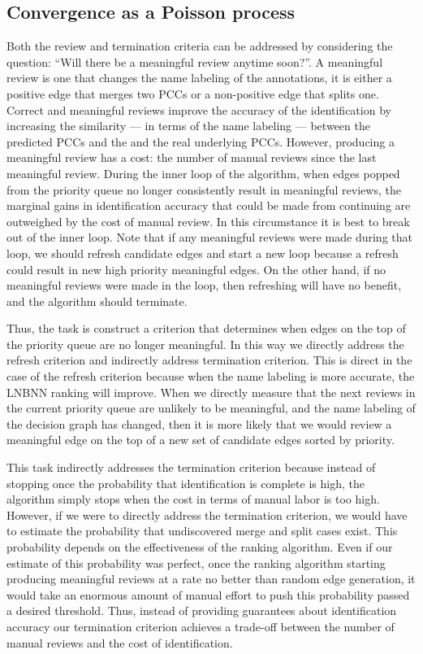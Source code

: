 \subsection{Convergence as a Poisson process}

Both the review and termination criteria can be addressed by considering the question:
``Will there be a meaningful review anytime soon?''.
A meaningful review is one that changes the name labeling of the annotations, \ie{} it is either a positive edge
  that merges two PCCs or a non-positive edge that splits one.
Correct and meaningful reviews improve the accuracy of the identification by increasing the similarity --- in
  terms of the name labeling --- between the predicted PCCs and the and the real underlying PCCs.
However, producing a meaningful review has a cost:
the number of manual reviews since the last meaningful review.
During the inner loop of the algorithm, when edges popped from the priority queue no longer consistently result
  in meaningful reviews, the marginal gains in identification accuracy that could be made from continuing are
  outweighed by the cost of manual review.
In this circumstance it is best to break out of the inner loop.
Note that if any meaningful reviews were made during that loop, we should refresh candidate edges and start a new
  loop because a refresh could result in new high priority meaningful edges.
On the other hand, if no meaningful reviews were made in the loop, then refreshing will have no benefit, and the
  algorithm should terminate.

Thus, the task is construct a criterion that determines when edges on the top of the priority queue are no longer
  meaningful.
In this way we directly address the refresh criterion and indirectly address termination criterion.
This is direct in the case of the refresh criterion because when the name labeling is more accurate, the LNBNN
  ranking will improve.
When we directly measure that the next reviews in the current priority queue are unlikely to be meaningful, and
  the name labeling of the decision graph has changed, then it is more likely that we would review a meaningful
  edge on the top of a new set of candidate edges sorted by priority.

This task indirectly addresses the termination criterion because instead of stopping once the probability that
  identification is complete is high, the algorithm simply stops when the cost in terms of manual labor is too
  high.
However, if we were to directly address the termination criterion, we would have to estimate the probability that
  undiscovered merge and split cases exist.
This probability depends on the effectiveness of the ranking algorithm.
Even if our estimate of this probability was perfect, once the ranking algorithm starting producing meaningful
  reviews at a rate no better than random edge generation, it would take an enormous amount of manual effort to
  push this probability passed a desired threshold.
Thus, instead of providing guarantees about identification accuracy our termination criterion achieves a
  trade-off between the number of manual reviews and the cost of identification.


